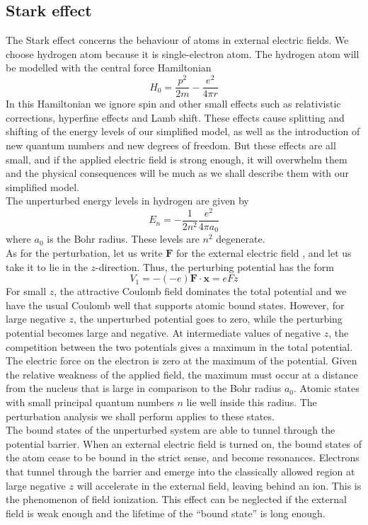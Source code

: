 \documentclass[cyan]{elegantnote}
\begin{document}
\subsection{Stark effect}
The Stark effect concerns the behaviour of atoms in external electric fields. We choose hydrogen atom because it is single-electron atom.
The hydrogen atom will be modelled with the central force Hamiltonian
\[H_0 = \frac{p^2}{2m} - \frac{e^2}{4\pi r}\]
In this Hamiltonian we ignore spin and other small effects such as relativistic corrections, hyperfine effects and Lamb shift. These effects cause splitting and shifting of the energy levels of our simplified model, as well as the introduction of new quantum numbers and new degrees of freedom.
But these effects are all small, and if the applied electric field is strong enough, it will overwhelm them and the physical consequences will be much as we shall describe them with our simplified model. \\
The unperturbed energy levels in hydrogen are given by
\[E_n = -\frac{1}{2n^2} \frac{e^2}{4\pi a_0}\]
where $a_0$ is the Bohr radius. These levels are $n^2$ degenerate.\\
As for the perturbation, let us write $\bm{F}$ for the external electric field , and let us take it to lie in the $z$-direction. Thus, the perturbing potential has the form
\[V_1 = -(-e)\bm{F}\cdot\bm{x} = eFz\]
For small $z$, the attractive Coulomb field dominates the total potential and we have the usual Coulomb well that supports atomic bound states. However, for large negative $z$, the unperturbed potential goes to zero, while the perturbing
potential becomes large and negative. At intermediate values of negative $z$, the competition between the two potentials gives a maximum in the total potential. The electric force on the electron is zero at the maximum of the potential. 
Given the relative weakness of the applied field, the maximum must occur at a distance from the nucleus that is large in comparison to the Bohr radius $a_0$. Atomic states with small principal quantum numbers $n$ lie well inside this radius. The perturbation analysis we shall perform applies to these states.\\
The bound states of the unperturbed system are able to tunnel through the potential barrier. When an external electric field is turned on, the bound states of the atom cease to be bound in the strict sense, and become resonances. 
Electrons that tunnel through the barrier and emerge into the classically allowed region at large negative $z$ will accelerate in the external field, leaving behind an ion. This is the phenomenon of field ionization. This effect can be neglected if the external field is weak enough and the lifetime of the ``bound state'' is long enough.\\ \\
\end{document}
